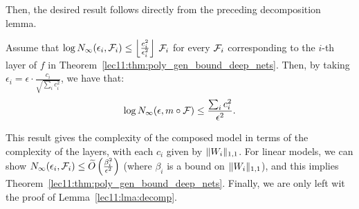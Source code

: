 Then, the desired result follows directly from the preceding decomposition lemma.
\begin{corollary} Assume that $\log N_\infty(\epsilon_i, \mathcal F_i) \leq \left \lfloor \frac{c_i^2}{\epsilon_i^2} \right \rfloor$ $\mathcal F_i$ for every $\mathcal F_i$ corresponding to the $i$-th layer of $f$ in Theorem~\ref{lec11:thm:poly_gen_bound_deep_nets}. Then, by taking $\epsilon_i = \epsilon \cdot \frac{c_i}{\sqrt{\sum_i c_i^2}}$, we have that:
\begin{equation}
    \log N_\infty(\epsilon, m \circ \mathcal F) \leq \frac{\sum_i c_i^2}{\epsilon^2}.
\end{equation}
\end{corollary}
This result gives the complexity of the composed model in terms of the complexity of the layers, with each $c_i$ given by $\|W_i\|_{1, 1}$. For linear models, we can show $N_\infty(\epsilon_i, \mathcal F_i) \leq \widetilde{O}\left (\frac{\beta_i^2}{\epsilon^2} \right )$ (where $\beta_i$ is a bound on $\|W_i\|_{1, 1}$), and this implies Theorem~\ref{lec11:thm:poly_gen_bound_deep_nets}. Finally, we are only left wit the proof of Lemma~\ref{lec11:lma:decomp}. 


